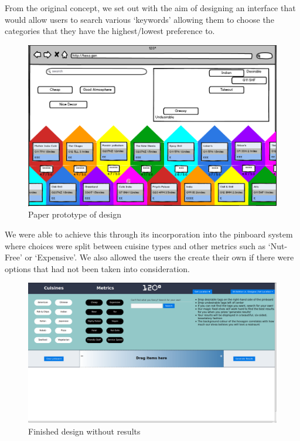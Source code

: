 \documentclass[10pt,a4paper]{article}
\begin{document}
From the original concept, we set out with the aim of designing an interface that would allow users to search various ‘keywords’ allowing them to choose the categories that they have the highest/lowest preference to.

\begin{figure}[H]
	\begin{center}
		\includegraphics[scale=0.37]{Screenshot.png}
		\caption{Paper prototype of design}
		\label{figure:prototype}
	\end{center}
\end{figure}


We were able to achieve this through its incorporation into the pinboard system where choices were split between cuisine types and other metrics such as ‘Nut-Free’ or ‘Expensive’. We also allowed the users the create their own if there were options that had not been taken into consideration.

\begin{figure}[H]
	\begin{center}
		\includegraphics[scale=0.2]{newScreenshot.png}
		\caption{Finished design without results}
		\label{figure:finished-design-no-results}
	\end{center}
\end{figure}
\end{document}
